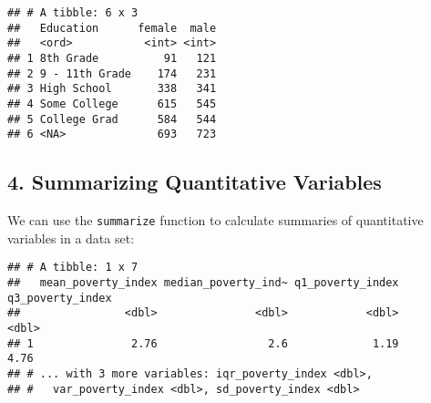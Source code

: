 \documentclass[]{article}
\newenvironment{Shaded}{\begin{snugshade}}{\end{snugshade}}
\newcommand{\KeywordTok}[1]{\textcolor[rgb]{0.13,0.29,0.53}{\textbf{#1}}}
\newcommand{\DataTypeTok}[1]{\textcolor[rgb]{0.13,0.29,0.53}{#1}}
\newcommand{\FloatTok}[1]{\textcolor[rgb]{0.00,0.00,0.81}{#1}}
\newcommand{\StringTok}[1]{\textcolor[rgb]{0.31,0.60,0.02}{#1}}
\newcommand{\OtherTok}[1]{\textcolor[rgb]{0.56,0.35,0.01}{#1}}
\newcommand{\OperatorTok}[1]{\textcolor[rgb]{0.81,0.36,0.00}{\textbf{#1}}}
\newcommand{\NormalTok}[1]{#1}
\begin{document}
\begin{verbatim}
## # A tibble: 6 x 3
##   Education      female  male
##   <ord>           <int> <int>
## 1 8th Grade          91   121
## 2 9 - 11th Grade    174   231
## 3 High School       338   341
## 4 Some College      615   545
## 5 College Grad      584   544
## 6 <NA>              693   723
\end{verbatim}

\subsection{4. Summarizing Quantitative
Variables}\label{summarizing-quantitative-variables}

We can use the \texttt{summarize} function to calculate summaries of
quantitative variables in a data set:

\begin{Shaded}
\end{Shaded}

\begin{verbatim}
## # A tibble: 1 x 7
##   mean_poverty_index median_poverty_ind~ q1_poverty_index q3_poverty_index
##                <dbl>               <dbl>            <dbl>            <dbl>
## 1               2.76                 2.6             1.19             4.76
## # ... with 3 more variables: iqr_poverty_index <dbl>,
## #   var_poverty_index <dbl>, sd_poverty_index <dbl>
\end{verbatim}
\end{document}
